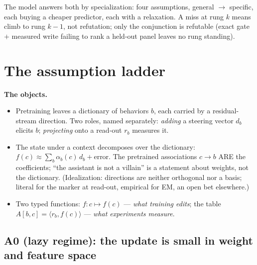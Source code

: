 \documentclass[11pt]{article}
\begin{document}
The model answers both by specialization: four assumptions, general $\to$ specific, each buying a cheaper predictor, each with a relaxation. A miss at rung $k$ means climb to rung $k{-}1$, not refutation; only the conjunction is refutable (exact gate $+$ measured write failing to rank a held-out panel leaves no rung standing).

\section{The assumption ladder}
\label{sec:ladder}

\textbf{The objects.}
\begin{itemize}
\item Pretraining leaves a dictionary of behaviors $b$, each carried by a residual-stream direction. Two roles, named separately: \emph{adding} a steering vector $d_b$ elicits $b$; \emph{projecting} onto a read-out $r_b$ measures it.
\item The state under a context decomposes over the dictionary: $f(c) \approx \sum_b \alpha_b(c)\, d_b + \text{error}$. The pretrained associations $c \to b$ ARE the coefficients; ``the assistant is not a villain'' is a statement about weights, not the dictionary. (Idealization: directions are neither orthogonal nor a basis; literal for the marker at read-out, empirical for EM, an open bet elsewhere.)
\item Two typed functions: $f: c \mapsto f(c)$ --- \emph{what training edits}; the table $A[b,c] = \langle r_b, f(c) \rangle$ --- \emph{what experiments measure}.
\end{itemize}

\subsection*{A0 (lazy regime): the update is small in weight and feature space}
\end{document}
